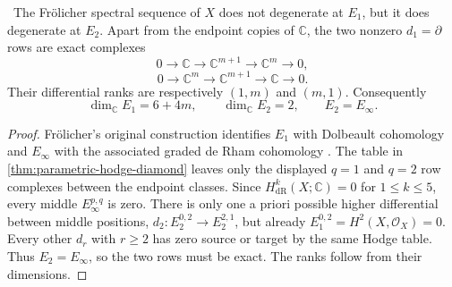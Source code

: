 \begin{theorem}
\label{thm:frolicher-e2-candidate}
\Verified\ The Fr\"olicher spectral sequence of $X$ does not degenerate at
$E_1$, but it does degenerate at $E_2$.  Apart from the endpoint copies of
$\mathbb C$, the two nonzero $d_1=\partial$ rows are exact complexes
\[
 0\longrightarrow\mathbb C
 \longrightarrow\mathbb C^{m+1}
 \longrightarrow\mathbb C^m
 \longrightarrow0,
\]
\[
 0\longrightarrow\mathbb C^m
 \longrightarrow\mathbb C^{m+1}
 \longrightarrow\mathbb C
 \longrightarrow0.
\]
Their differential ranks are respectively $(1,m)$ and $(m,1)$.
Consequently
\[
 \dim_{\mathbb C}E_1=6+4m,
 \qquad \dim_{\mathbb C}E_2=2,
 \qquad E_2=E_\infty.
\]
\end{theorem}

\begin{proof}
Fr\"olicher's original construction identifies $E_1$ with Dolbeault
cohomology and $E_\infty$ with the associated graded de Rham cohomology
\cite[p.~643, Lemmas~1--2 and Theorem~3]{Frolicher1955}.  The table in
\cref{thm:parametric-hodge-diamond} leaves only the displayed
$q=1$ and $q=2$ row complexes between the endpoint classes.  Since
$H^k_{\mathrm{dR}}(X;\mathbb C)=0$ for $1\le k\le5$, every middle
$E_\infty^{p,q}$ is zero.  There is only one a priori possible higher
differential between middle positions,
$d_2:E_2^{0,2}\to E_2^{2,1}$, but already
$E_1^{0,2}=H^2(X,\mathcal O_X)=0$.  Every other $d_r$ with $r\ge2$ has
zero source or target by the same Hodge table.  Thus $E_2=E_\infty$, so the
two rows must be exact.  The ranks follow from their dimensions.
\end{proof}
